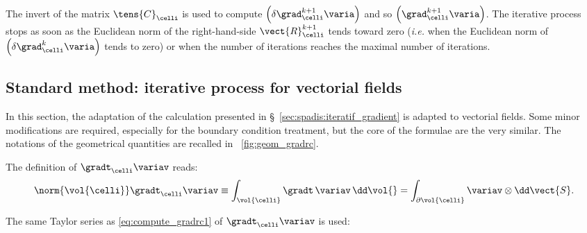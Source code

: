 The invert of the matrix $\tens{C}_{\celli}$ is used to compute $\left( \delta \grad_\celli^{k+1} \varia \right)$ 
and so $\left( \grad^{k+1}_{\celli} \varia \right)$. The iterative process stops as soon as the Euclidean norm of the right-hand-side $\vect{R}^{k+1}_{\celli}$ tends toward zero (\emph{i.e.} when the Euclidean norm
of $\left( \delta \grad^{k}_{\celli} \varia \right)$ tends to zero) or when the number of iterations reaches the maximal number of iterations.

\subsection{Standard method: iterative process for vectorial fields}\label{sec:spadis:iteratif_gradient_vectors}
In this section, the adaptation of the calculation presented in \S~\ref{sec:spadis:iteratif_gradient} is adapted to 
vectorial fields. Some minor modifications are required, especially for the boundary condition treatment, but the core of the 
formulae are the very similar. The notations of the geometrical quantities are recalled in \figurename~\ref{fig:geom_gradrc}.

The definition of $\gradt_{\celli} \variav $ reads:
\begin{equation}
\norm{\vol{\celli}} \gradt_{\celli} \variav \equiv  \displaystyle \int_{\vol{\celli}}{\gradt \, \variav \, \dd \vol{} } = \int_{\partial \vol{\celli}} \variav \otimes \dd \vect{S}.
\end{equation}

The same Taylor series as \eqref{eq:compute_gradrc1} of $\gradt_{\celli} \variav$ is used:

